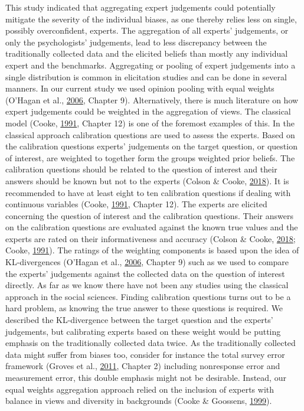 \documentclass[openright,titlepage,12pt,a4paper]{book}
\begin{document}
This study indicated that aggregating expert judgements could potentially mitigate the severity of the individual biases, as one thereby relies less on single, possibly overconfident, experts. The aggregation of all experts' judgements, or only the psychologists' judgements, lead to less discrepancy between the traditionally collected data and the elicited beliefs than mostly any individual expert and the benchmarks. Aggregating or pooling of expert judgements into a single distribution is common in elicitation studies and can be done in several manners. In our current study we used opinion pooling with equal weights (O'Hagan et al., \protect\hyperlink{ref-ohagan_uncertain_2006}{2006}, Chapter 9). Alternatively, there is much literature on how expert judgements could be weighted in the aggregation of views. The classical model (Cooke, \protect\hyperlink{ref-cooke_experts_1991}{1991}, Chapter 12) is one of the foremost examples of this. In the classical approach calibration questions are used to assess the experts. Based on the calibration questions experts' judgements on the target question, or question of interest, are weighted to together form the groups weighted prior beliefs. The calibration questions should be related to the question of interest and their answers should be known but not to the experts (Colson \& Cooke, \protect\hyperlink{ref-colson_expert_2018}{2018}). It is recommended to have at least eight to ten calibration questions if dealing with continuous variables (Cooke, \protect\hyperlink{ref-cooke_experts_1991}{1991}, Chapter 12). The experts are elicited concerning the question of interest and the calibration questions. Their answers on the calibration questions are evaluated against the known true values and the experts are rated on their informativeness and accuracy (Colson \& Cooke, \protect\hyperlink{ref-colson_expert_2018}{2018}; Cooke, \protect\hyperlink{ref-cooke_experts_1991}{1991}). The ratings of the weighting components is based upon the idea of KL-divergences (O'Hagan et al., \protect\hyperlink{ref-ohagan_uncertain_2006}{2006}, Chapter 9) such as we used to compare the experts' judgements against the collected data on the question of interest directly. As far as we know there have not been any studies using the classical approach in the social sciences. Finding calibration questions turns out to be a hard problem, as knowing the true answer to these questions is required. We described the KL-divergence between the target question and the experts' judgements, but calibrating experts based on these weight would be putting emphasis on the traditionally collected data twice. As the traditionally collected data might suffer from biases too, consider for instance the total survey error framework (Groves et al., \protect\hyperlink{ref-groves_survey_2011}{2011}, Chapter 2) including nonresponse error and measurement error, this double emphasis might not be desirable. Instead, our equal weights aggregation approach relied on the inclusion of experts with balance in views and diversity in backgrounds (Cooke \& Goossens, \protect\hyperlink{ref-cooke_procedures_1999}{1999}).
\end{document}
